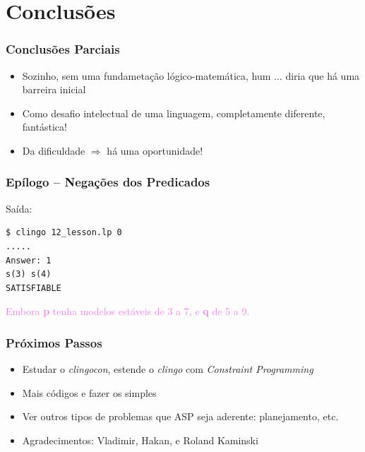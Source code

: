\documentclass{beamer}
\begin{document}
\section{Conclusões}

\begin{frame}
	\frametitle{Conclusões Parciais}
	
		
\begin{block}{}
	
	\begin{itemize}
		\item Sozinho, sem uma fundametação lógico-matemática, hum ... diria que há uma barreira inicial
		\pause
		
		\item Como desafio intelectual de uma linguagem,
		completamente diferente, fantástica!
		\pause
		
		\item Da dificuldade $\Rightarrow$ há uma oportunidade!
		
		
	\end{itemize}
\end{block}

\end{frame}




\begin{frame} [fragile]
	\frametitle{Epílogo -- Negações dos Predicados}


	

Saída:
\pause
{\small
\begin{verbatim}
$ clingo 12_lesson.lp 0
.....
Answer: 1
s(3) s(4)
SATISFIABLE
\end{verbatim}
}	

\textcolor{violet}{Embora \textbf{p} tenha modelos estáveis de 3 a 7, e  \textbf{q}  de 5 a 9.}


\end{frame}


\begin{frame} 
	\frametitle{Próximos Passos}
	
\begin{block}{}
	
	\begin{itemize}
		\item Estudar o \emph{clingocon}, estende o \emph{clingo} com \emph{Constraint Programming}

		\item Mais códigos e fazer os simples
		\item Ver outros tipos de problemas que ASP seja aderente: planejamento, etc.
		
		\item Agradecimentos: Vladimir,  Hakan, 	e	Roland Kaminski
		
	\end{itemize}
\end{block}
\end{frame}
\end{document}
